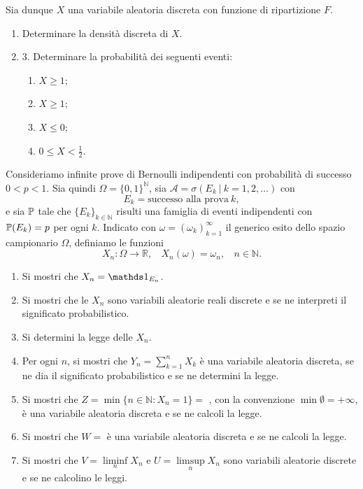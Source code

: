Sia dunque $X$ una variabile aleatoria discreta con funzione di ripartizione $F$.
\begin{enumerate}
\item Determinare la densità discreta di $X$.
\item 3. Determinare la probabilità dei seguenti eventi:
\begin{enumerate}
\item $X\geq 1$;
\item $X\geq 1$;
\item $X\leq 0$;
\item $0\leq X< \frac{1}{2}$.
\end{enumerate}
\end{enumerate}


Consideriamo infinite prove di Bernoulli indipendenti con probabilità di successo $0< p< 1$. Sia quindi $\Omega =\{0,1\}^{\mathbb{N}}$, sia $\mathcal{A} =\sigma ( E_{k} \ |\ k=1,2,\dots )$ con
\begin{equation*}
E_{k} =\text{successo alla prova} \ k,
\end{equation*}
e sia $\mathbb{P}$ tale che $\{E_{k}\}_{k\in \mathbb{N}}$ risulti una famiglia di eventi indipendenti con $\mathbb{P}( E_{k}) =p$ per ogni $k$. Indicato con $\omega =( \omega _{k})_{k=1}^{\infty }$ il generico esito dello spazio campionario $\Omega $, definiamo le funzioni
\begin{equation*}
X_{n} :\Omega \rightarrow \mathbb{R} ,\ \ \ \ X_{n}( \omega ) =\omega _{n} ,\ \ \ \ n\in \mathbb{N} .
\end{equation*}
\begin{enumerate}
\item Si mostri che $X_{n} =\Ind_{E_{n}}$.
\item Si mostri che le $X_{n}$ sono variabili aleatorie reali discrete e se ne interpreti il significato probabilistico.
\item Si determini la legge delle $X_{n}$.
\item Per ogni $n$, si mostri che $Y_{n} =\sum _{k=1}^{n} X_{k}$ è una variabile aleatoria discreta, se ne dia il significato probabilistico e se ne determini la legge.
\item Si mostri che $Z=\min\{n\in \mathbb{N} :X_{n} =1\} =$ , con la convenzione $\min \emptyset =+\infty $, è una variabile aleatoria discreta e se ne calcoli la legge.
\item Si mostri che $W=$  è una variabile aleatoria discreta e se ne calcoli la legge.
\item Si mostri che $V=\liminf\limits _{n} X_{n}$ e $U=\limsup\limits _{n} X_{n}$ sono variabili aleatorie discrete e se ne calcolino le leggi.
\end{enumerate}

